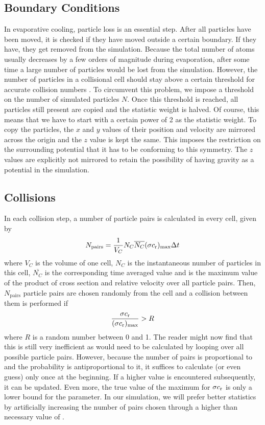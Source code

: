\subsection{Boundary Conditions}
In evaporative cooling, particle loss is an essential step. After all particles have been moved, it is checked if they have moved outside a certain boundary. If they have, they get removed from the simulation. Because the total number of atoms usually decreases by a few orders of magnitude during evaporation, after some time a large number of particles would be lost from the simulation. However, the number of particles in a collisional cell should stay above a certain threshold for accurate collision numbers \cite{SUN20111}. To circumvent this problem, we impose a threshold on the number of simulated particles $N$. Once this threshold is reached, all particles still present are copied and the statistic weight is halved. Of course, this means that we have to start with a certain power of 2 as the statistic weight. To copy the particles, the $x$ and $y$ values of their position and velocity are mirrored across the origin and the $z$ value is kept the same. This imposes the restriction on the surrounding potential that it has to be conforming to this symmetry. The $z$ values are explicitly not mirrored to retain the possibility of having gravity as a potential in the simulation.

\subsection{Collisions}
\label{sec:eva_theory_collisions}
In each collision step, a number of particle pairs is calculated in every cell, given by
\begin{equation} \label{eq:ntc_npairs}
    N_\text{pairs} = \frac{1}{V_C} N_C \overline{N_C} (\sigma c_\text{r})_\text{max} \Delta t
\end{equation}
where $V_C$ is the volume of one cell, $N_C$ is the instantaneous number of particles in this cell, $\overline{N_C}$ is the corresponding time averaged value and \maxProb is the maximum value of the product of cross section and relative velocity over all particle pairs. 
Then, $N_\text{pairs}$ particle pairs are chosen randomly from the cell and a collision between them is performed if 
\begin{equation} \label{eq:ntc_fraction}
    \frac{\sigma c_\text{r}}{(\sigma c_\text{r})_\text{max}} > R
\end{equation} 
where $R$ is a random number between 0 and 1.
The reader might now find that this is still very inefficient as \maxProb would need to be calculated by looping over all possible particle pairs. However, because the number of pairs is proportional to \maxProb and the probability is antiproportional to it, it suffices to calculate (or even guess) \maxProb only once at the beginning. If a higher value is encountered subsequently, it can be updated. Even more, the true value of the maximum for $\sigma c_\text{r}$ is only a lower bound for the \maxProb parameter. In our simulation, we will prefer better statistics by artificially increasing the number of pairs chosen through a higher than necessary value of \maxProb.

